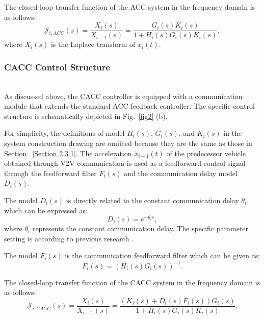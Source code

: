 \documentclass[journal]{IEEEtran}
\begin{document}
The closed-loop transfer function of the ACC system in the frequency domain is as follows:
\begin{equation}
  \mathcal{J}_{i, A C C}(s)=\frac{X_{i}(s)}{X_{i-1}(s)}=\frac{G_{i}(s) K_{i}(s)}{1+H_{i}(s) G_{i}(s) K_{i}(s)},
\end{equation}
where $X_i (s)$ is the Laplace transform of $x_i (t)$.

\subsubsection{CACC Control Structure}
\label{Section 2.3.2}
~\\

As discussed above, the CACC controller is equipped with a communication module that extends the standard ACC feedback controller. The specific control structure is schematically depicted in Fig.~\ref{fig2} (b).

For simplicity, the definitions of model $H_i(s)$, $G_i(s)$, and $K_i(s)$ in the system construction drawing are omitted because they are the same as those in Section.~\ref{Section 2.3.1}. The acceleration $\ddot{x}_{i-1}(t)$ of the predecessor vehicle obtained through V2V communication is used as a feedforward control signal through the feedforward filter $F_i(s)$ and the communication delay model $D_i(s)$.

The model $D_i(s)$ is directly related to the constant communication delay $\theta_i$, which can be expressed as:
\begin{equation}
  D_{i}(s)=e^{-\theta_{i} s},
\end{equation}
where $\theta_i$ represents the constant communication delay. The specific parameter setting is according to previous research \citep{navas2016using,zhang2020control}.

The model $F_i(s)$ is the communication feedforward filter which can be given as:
\begin{equation}
  F_{i}(s)=\left(H_{i}(s) G_{i}(s)\right)^{-1}.
\end{equation}

The closed-loop transfer function of the CACC system in the frequency domain is as follows:
\begin{equation}
  \mathcal{J}_{i, C A C C}(s)=\frac{X_{i}(s)}{X_{i-1}(s)}=\frac{\left(K_{i}(s)+D_{i}(s) F_{i}(s)\right) G_{i}(s)}{1+H_{i}(s) G_{i}(s) K_{i}(s)}.
\end{equation}
\end{document}
